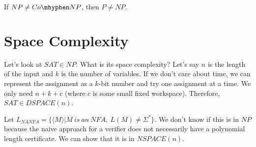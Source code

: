 If $NP\neq Co\mhyphen NP$, then $P\neq NP$.


\section*{Space Complexity}




Let's look at $SAT\in NP$.  What is its space complexity?  Let's say $n$ is the length of the input and $k$ is the number of variables.  If we don't care about time, we can represent the assignment as a $k$-bit number and try one assignment at a time.  We only need $n+k+c$ (where $c$ is some small fixed workspace).  Therefore, $SAT\in DSPACE(n)$.

Let $L_{NANFA} = \{ \langle M \rangle | M \ is \ an \ NFA, \ L(M)\neq \Sigma^* \}$.  We don't know if this is in $NP$ because the naive approach for a verifier does not necessarily have a polynomial length certificate.  We can show that it is in $NSPACE(n)$.









